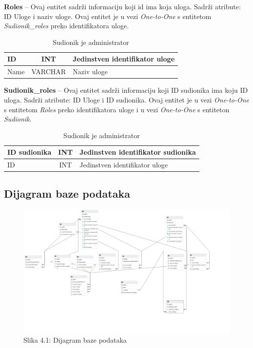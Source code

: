\textbf{Roles} – Ovaj entitet sadrži informaciju koji id ima koja uloga. Sadrži atribute: ID Uloge i naziv uloge. Ovaj entitet je u vezi \textit{One-to-One} s entitetom \textit{Sudionik_roles} preko identifikatora uloge.

\begin{table}[H]
	\caption{Sudionik je administrator}
	\label{tbl:sudionikJeAdministrator}
	\centering
	\begin{tabular}{|l|c|l|} 
		\hline
		\cellcolor{lightblue}ID & INT & Jedinstven identifikator uloge\\ 
		\hline
		Name & VARCHAR & Naziv uloge\\ 
		\hline
	\end{tabular}
\end{table}

\textbf{Sudionik_roles} – Ovaj entitet sadrži informaciju koji ID sudionika ima koju ID uloga. Sadrži atribute: ID Uloge i ID sudionika. Ovaj entitet je u vezi \textit{One-to-One} s entitetom \textit{Roles} preko identifikatora uloge i u vezi \textit{One-to-One} s entiteton \textit{Sudionik}.

\begin{table}[H]
	\caption{Sudionik je administrator}
	\label{tbl:sudionikJeAdministrator}
	\centering
	\begin{tabular}{|l|c|l|} 
		\hline
		\cellcolor{lightblue}ID sudionika & INT & Jedinstven identifikator sudionika\\ 
		\hline
		\cellcolor{lightblue}ID  & INT & Jedinstven identifikator uloge\\ 
		\hline
	\end{tabular}
\end{table}

		
				
			
\subsection{Dijagram baze podataka}

\begin{figure}[htb]
	\centering
	\includegraphics[width=15cm]{slike/dijagram.jpg}
	\caption{Slika 4.1: Dijagram baze podataka}
	\label{fig:fer-logo}
\end{figure}
			
